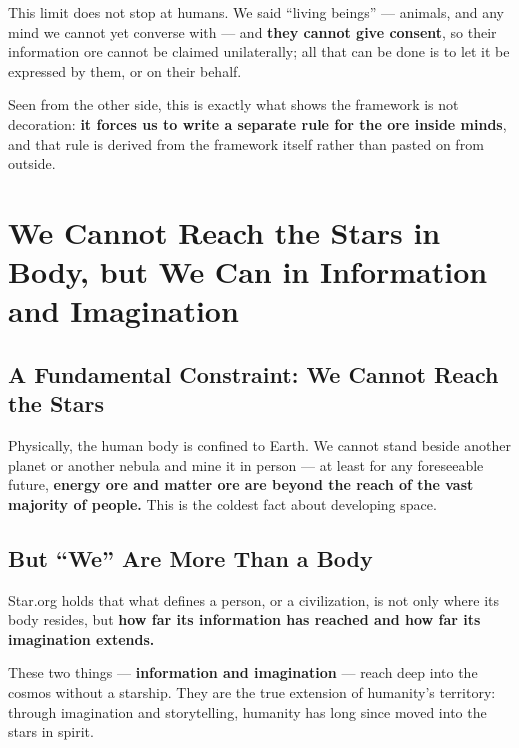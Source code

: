 \documentclass[11pt,fontset=none]{ctexart}
\begin{document}

This limit does not stop at humans. We said ``living beings'' --- animals, and any mind we cannot yet converse with --- and \textbf{they cannot give consent}, so their information ore cannot be claimed unilaterally; all that can be done is to let it be expressed by them, or on their behalf.

Seen from the other side, this is exactly what shows the framework is not decoration: \textbf{it forces us to write a separate rule for the ore inside minds}, and that rule is derived from the framework itself rather than pasted on from outside.

\section{We Cannot Reach the Stars in Body, but We Can in Information and Imagination}

\subsection{A Fundamental Constraint: We Cannot Reach the Stars}

Physically, the human body is confined to Earth. We cannot stand beside another planet or another nebula and mine it in person — at least for any foreseeable future, \textbf{energy ore and matter ore are beyond the reach of the vast majority of people.} This is the coldest fact about developing space.

\subsection{But ``We'' Are More Than a Body}

Star.org holds that what defines a person, or a civilization, is not only where its body resides, but \textbf{how far its information has reached and how far its imagination extends.}


These two things — \textbf{information and imagination} — reach deep into the cosmos without a starship. They are the true extension of humanity's territory: through imagination and storytelling, humanity has long since moved into the stars in spirit.
\end{document}

